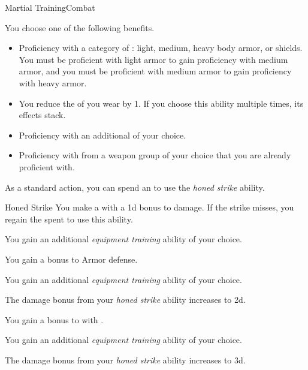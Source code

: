     \begin{feat}{Martial Training}{Combat}

         You choose one of the following benefits.
        \begin{itemize}
            \item Proficiency with a category of : light, medium, heavy body armor, or shields.
                You must be proficient with light armor to gain proficiency with medium armor, and you must be proficient with medium armor to gain proficiency with heavy armor.
            \item You reduce the  of  you wear by 1.
                If you choose this ability multiple times, its effects stack.
            \item Proficiency with an additional  of your choice.
            \item Proficiency with  from a weapon group of your choice that you are already proficient with.
        \end{itemize}

         As a standard action, you can spend an  to use the \textit{honed strike} ability.
        \begin{ability}{Honed Strike}
            You make a  with a \plus1d bonus to damage.
            If the strike misses, you regain the  spent to use this ability.
        \end{ability}

         You gain an additional \textit{equipment training} ability of your choice.

         You gain a  bonus to Armor defense.

         You gain an additional \textit{equipment training} ability of your choice.

         The damage bonus from your \textit{honed strike} ability increases to \plus2d.

         You gain a  bonus to  with .

         You gain an additional \textit{equipment training} ability of your choice.

         The damage bonus from your \textit{honed strike} ability increases to \plus3d.
    \end{feat}


